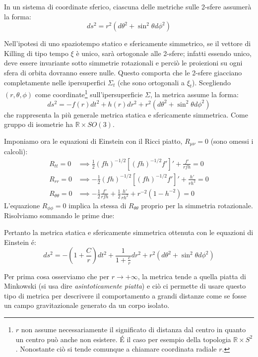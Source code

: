 In un sistema di coordinate sferico, ciascuna delle metriche sulle 2-sfere assumerà la forma:
\begin{equation}
    ds^2 = r^2(d\theta^2 + \sin^2\theta d\phi^2)
\end{equation}

Nell'ipotesi di uno spaziotempo statico e sfericamente simmetrico, se il vettore di Killing di tipo tempo $\xi$ è unico, sarà ortogonale alle 2-sfere; infatti essendo unico, deve essere invariante sotto simmetrie rotazionali e perciò le proiezioni su ogni sfera di orbita dovranno essere nulle. Questo comporta che le 2-sfere giacciano completamente nelle ipersuperfici $\Sigma_t$ (che sono ortogonali a $\xi_t$).
Scegliendo $(r,\theta,\phi)$ come coordinate\footnote{$r$ non assume necessariamente il significato di distanza dal centro in quanto un centro può anche non esistere. \'E il caso per esempio della topologia $\mathbb{R}\times S^2$. Nonostante ciò si tende comunque a chiamare coordinata radiale $r$.} sull'ipersuperficie $\Sigma$, la metrica assume la forma:
\begin{equation*}
    ds^2 = -f(r)dt^2 + h(r)dr^2 +r^2(d\theta^2 + \sin^2\theta d\phi^2)
\end{equation*}
che rappresenta la più generale metrica statica e sfericamente simmetrica. Come gruppo di isometrie ha $\mathbb{R}\times SO(3)$.

Imponiamo ora le equazioni di Einstein con il Ricci piatto, $R_{\mu\nu}=0$ (sono omessi i calcoli):
\begin{align*}
    R_{tt}=0 &\implies \frac{1}{2} (fh)^{-1/2}[(fh)^{-1/2}f']' + \frac{f'}{rfh} = 0 \\
    R_{rr}= 0 &\implies -\frac{1}{2}(fh)^{-1/2}[(fh)^{-1/2}f']' + \frac{h'}{rh^2} = 0 \\
    R_{\theta\theta}=0 &\implies -\frac{1}{2}\frac{f'}{rfh}+\frac{1}{2}\frac{h'}{rh^2} + r^{-2}(1-h^{-2}) = 0
\end{align*}
L'equazione $R_{\phi\phi}=0$ implica la stessa di $R_{\theta\theta}$ proprio per la simmetria rotazionale. Risolviamo sommando le prime due:

Pertanto la metrica statica e sfericamente simmetrica ottenuta con le equazioni di Einstein é:
\begin{equation}
    ds^2 = -\left( 1+ \frac{C}{r}\right)dt^2 + \frac{1}{1+ \frac{c}{r}}dr^2 +r^2(d\theta^2 + \sin^2\theta d\phi^2)
    \label{eq.metricageneraleschwarz}
\end{equation}

Per prima cosa osserviamo che per $r \rightarrow +\infty$, la metrica tende a quella piatta di Minkowski (si usa dire \textit{asintoticamente piatta}) e ciò ci permette di usare questo tipo di metrica per descrivere il comportamento a grandi distanze come se fosse un campo gravitazionale generato da un corpo isolato.

